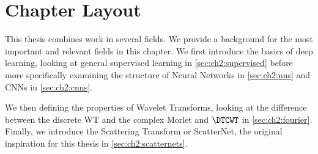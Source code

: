 \section{Chapter Layout}
This thesis combines work in several fields. We provide a background for the
most important and relevant fields in this chapter. We first introduce the
basics of deep learning, looking at general supervised learning in \autoref{sec:ch2:supervised}
before more specifically examining the structure of Neural Networks
in \autoref{sec:ch2:nns} and CNNs in \autoref{sec:ch2:cnns}.

We then defining the properties of Wavelet Transforms, looking at the difference
between the discrete WT and the complex Morlet and $\DTCWT$ in
\autoref{sec:ch2:fourier}.
Finally, we introduce the Scattering Transform or ScatterNet, the original
inspiration for this thesis in \autoref{sec:ch2:scatternets}.
